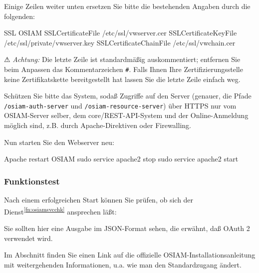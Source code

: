 \documentclass{tarentanleitung}
\begin{document}
\begin{minipage}{\linewidth}
Einige Zeilen weiter unten ersetzen Sie bitte die bestehenden
Angaben durch die folgenden:

\begin{lstdump}{SSL OSIAM}
SSLCertificateFile /etc/ssl/vwserver.cer
SSLCertificateKeyFile /etc/ssl/private/vwserver.key
SSLCertificateChainFile /etc/ssl/vwchain.cer
\end{lstdump}

⚠ \emph{Achtung:} Die letzte Zeile ist standardmäßig auskommentiert;
entfernen Sie beim Anpassen das Kommentarzeichen \texttt{\#}. Falls
Ihnen Ihre Zertifizierungsstelle keine Zertifikatskette bereitgestellt
hat lassen Sie die letzte Zeile einfach weg.
\end{minipage}

Schützen Sie bitte das System, sodaß Zugriffe auf den Server (genauer,
die Pfade \texttt{/osiam-auth-server} und \texttt{/osiam-resource-server})
über HTTPS nur vom OSIAM-Server selber, dem core/REST-API-System und der
Online-Anmeldung möglich sind, z.B. durch Apache-Direktiven oder Firewalling.

\begin{minipage}{\linewidth}
Nun starten Sie den Webserver neu:

\begin{lstdump}{Apache restart OSIAM}
sudo service apache2 stop
sudo service apache2 start
\end{lstdump}
\end{minipage}

\subsubsection{Funktionstest}\label{subsubsec:setup-osiam-check}

\begin{minipage}{\linewidth}
Nach einem erfolgreichen Start können Sie prüfen, ob sich der
Dienst\Hair\textsuperscript{\ref{fn:osiamsvcchk}} ansprechen läßt:


Sie sollten hier eine Ausgabe im JSON-Format sehen, die erwähnt,
daß OAuth 2 verwendet wird.
\end{minipage}

Im Abschnitt  finden Sie einen Link auf die
offizielle OSIAM-Installationsanleitung mit weitergehenden
Informationen, u.a. wie man den Standardzugang ändert.
\end{document}
